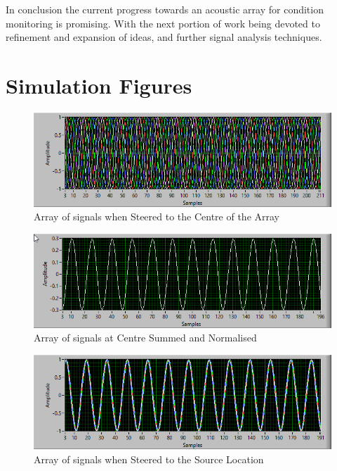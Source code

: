 \documentclass{UoNMCHA}
\numberwithin{equation}{section}
\begin{document}
    In conclusion the current progress towards an acoustic array for condition monitoring is promising. With the next portion of work being devoted to refinement and expansion of ideas, and further signal analysis techniques.
\newpage


\newpage
\appendix
\captionsetup[figure]{list=no}
\section{Simulation Figures} \label{app:Sim}
    \begin{figure}[H]
        \centering
        \includegraphics[keepaspectratio, width = \textwidth]{Figures/SimSignalCentre.png}
        \caption{Array of signals when Steered to the Centre of the Array}
    \end{figure}
    \begin{figure}[H]
        \centering
        \includegraphics[keepaspectratio, width = \textwidth]{Figures/SimSignalCentreSum.png}
        \caption{Array of signals at Centre Summed and Normalised}
    \end{figure}
    \begin{figure}[H]
        \centering
        \includegraphics[keepaspectratio, width = \textwidth]{Figures/SimSignalLocation.png}
        \caption{Array of signals when Steered to the Source Location}
    \end{figure}
\end{document}

